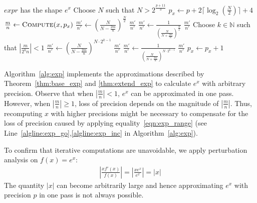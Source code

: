 \documentclass{article}
\newcommand{\true}{\textit{true}}
\newcommand{\expr}{\textit{expr}}
\newcommand{\nat}{\mathbb{N}}
\numberwithin{mytheorem}{section}
\begin{document}
\begin{algorithm}
\caption{Exponential Function}\label{alg:exp}
\begin{algorithmic}[1]
\Require $\expr$ has the shape $e^x$
\Procedure{Compute}{$\expr,p$}
\State Choose $N$ such that $N>2^{\frac{p+11}{3}}$
\State $p_x\gets p+2\lceil\log_2(\frac{N}{2}) \rceil+4$
\Repeat \label{algline:exp_go}
\State $\frac{m}{n}\gets \Call{Compute}{x,p_x}$\label{algline:exp}
 
	\State $\frac{m'}{n'}\gets (\frac{N}{N-\frac{2m}{n}})^{\frac{N}{2}}$
	\State \Return $\frac{m'}{n'}$
 
	\State $\frac{m'}{n'}\gets \frac{1}{(\frac{N}{N+\frac{2m}{n}})^{\frac{N}{2}}}$
	\State \Return $\frac{m'}{n'}$
\Else
	\State Choose $k\in\nat$ such that $|\frac{m}{2^kn}|<1$
		\State $\frac{m'}{n'}\gets (\frac{N}{N-\frac{2m}{n}})^{N\cdot 2^{k-1}}$
		\State \Return $\frac{m'}{n'}$
		\State $\frac{m'}{n'}\gets \frac{1}{(\frac{N}{N+\frac{2m}{n}})^{N\cdot 2^{k-1}}}$
		\State \Return $\frac{m'}{n'}$
	\Else
		\State $p_x\gets p_x +1$ \label{algline:exp_inc}
	\EndIf
\EndIf
\Until{$\true$}
\EndProcedure
\end{algorithmic}
\end{algorithm}
Algorithm~\ref{alg:exp} implements the approximations described by Theorem~\ref{thm:base_exp} and \ref{thm:extend_exp} to calculate $e^x$ with arbitrary precision. Observe that when $|\frac{m}{n}|<1$, $e^x$ can be approximated in one pass. However, when $|\frac{m}{n}|\geq 1$, loss of precision depends on the magnitude of $|\frac{m}{n}|$. Thus, recomputing $x$ with higher precisions might be necessary to compensate for the  loss of precision caused by applying equality~\eqref{eqn:exp_range} (see Line~\ref{algline:exp_go},\ref{algline:exp_inc} in Algorithm~\ref{alg:exp}).

To confirm that iterative computations are unavoidable, we apply perturbation analysis on $f(x)=e^x$:
\begin{align*}
|\frac{xf'(x)}{f(x)}|=|\frac{xe^x}{e^x}|=|x|
\end{align*}
The quantity $|x|$ can become arbitrarily large and hence approximating $e^x$ with precision $p$ in one pass is not always possible. 
\end{document}
